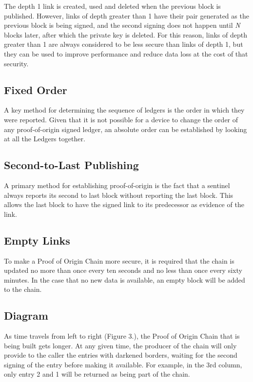 \documentclass{article}
\begin{document}
The depth 1 link is created, used and deleted when the previous block is published. However, links of depth greater than 1 have their pair generated as the previous block is being signed, and the second signing does not happen until \textit{N} blocks later, after which the private key is deleted. For this reason, links of depth greater than 1 are always considered to be less secure than links of depth 1, but they can be used to improve performance and reduce data loss at the cost of that security.

\subsection {Fixed Order}
A key method for determining the sequence of ledgers is the order in which they were reported. Given that it is not possible for a device to change the order of any \Gls{proof-of-origin} signed ledger, an absolute order can be established by looking at all the Ledgers together.

\subsection {Second-to-Last Publishing}
A primary method for establishing \Gls{proof-of-origin} is the fact that a \Gls{sentinel} always reports its second to last block without reporting the last block. This allows the last block to have the signed link to its predecessor as evidence of the link.

\subsection {Empty Links}
To make a Proof of Origin Chain more secure, it is required that the chain is updated no more than once every ten seconds and no less than once every sixty minutes. In the case that no new data is available, an empty block will be added to the chain.

\subsection {Diagram}
As time travels from left to right (Figure 3.), the Proof of Origin Chain that is being built gets longer. At any given time, the producer of the chain will only provide to the caller the entries with darkened borders, waiting for the second signing of the entry before making it available. For example, in the 3rd column, only entry 2 and 1 will be returned as being part of the chain.
\end{document}
